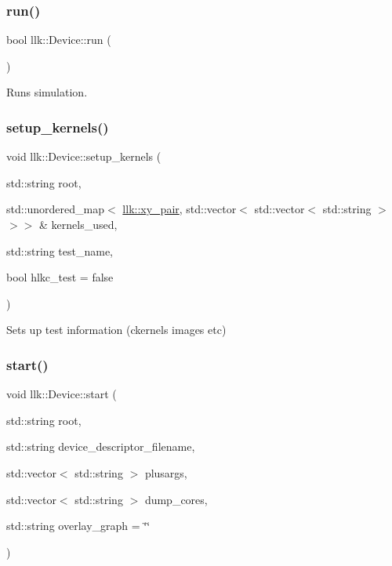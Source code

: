 \subsubsection{\texorpdfstring{run()}{run()}}
{\footnotesize\ttfamily bool llk\+::\+Device\+::run (\begin{DoxyParamCaption}{ }\end{DoxyParamCaption})}



Runs simulation. 

\mbox{\label{classllk_1_1Device_a8e68d577fd5c160567e31dc0518bd6e9}} 
\subsubsection{\texorpdfstring{setup\+\_\+kernels()}{setup\_kernels()}}
{\footnotesize\ttfamily void llk\+::\+Device\+::setup\+\_\+kernels (\begin{DoxyParamCaption}\item[{std\+::string}]{root,  }\item[{std\+::unordered\+\_\+map$<$ \hyperlink{structllk_1_1xy__pair}{llk\+::xy\+\_\+pair}, std\+::vector$<$ std\+::vector$<$ std\+::string $>$$>$$>$ \&}]{kernels\+\_\+used,  }\item[{std\+::string}]{test\+\_\+name,  }\item[{bool}]{hlkc\+\_\+test = {\ttfamily false} }\end{DoxyParamCaption})}



Sets up test information (ckernels images etc) 

\mbox{\label{classllk_1_1Device_a4be879d10344eab03473e53e41cc14b8}} 
\subsubsection{\texorpdfstring{start()}{start()}}
{\footnotesize\ttfamily void llk\+::\+Device\+::start (\begin{DoxyParamCaption}\item[{std\+::string}]{root,  }\item[{std\+::string}]{device\+\_\+descriptor\+\_\+filename,  }\item[{std\+::vector$<$ std\+::string $>$}]{plusargs,  }\item[{std\+::vector$<$ std\+::string $>$}]{dump\+\_\+cores,  }\item[{std\+::string}]{overlay\+\_\+graph = {\ttfamily \char`\"{}\char`\"{}} }\end{DoxyParamCaption})}



